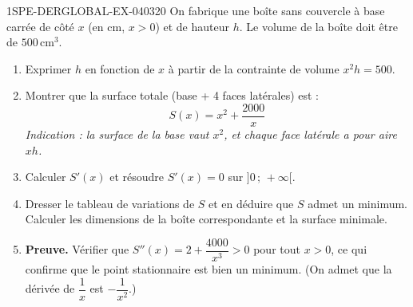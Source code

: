 \begin{exercice}{1SPE-DERGLOBAL-EX-040}{3}{20}
On fabrique une boîte sans couvercle à base carrée de côté $x$ (en cm, $x > 0$) et de hauteur $h$. Le volume de la boîte doit être de $500\,\text{cm}^3$.

\begin{enumerate}
\item Exprimer $h$ en fonction de $x$ à partir de la contrainte de volume $x^2 h = 500$.
\item Montrer que la surface totale (base + 4 faces latérales) est :
\[
S(x) = x^2 + \frac{2000}{x}
\]
\textit{Indication : la surface de la base vaut $x^2$, et chaque face latérale a pour aire $xh$.}
\item Calculer $S'(x)$ et résoudre $S'(x) = 0$ sur $]0\,;\,+\infty[$.
\item Dresser le tableau de variations de $S$ et en déduire que $S$ admet un minimum. Calculer les dimensions de la boîte correspondante et la surface minimale.
\item \textbf{Preuve.} Vérifier que $S''(x) = 2 + \dfrac{4000}{x^3} > 0$ pour tout $x > 0$, ce qui confirme que le point stationnaire est bien un minimum. (On admet que la dérivée de $\dfrac{1}{x}$ est $-\dfrac{1}{x^2}$.)
\end{enumerate}
\end{exercice}
